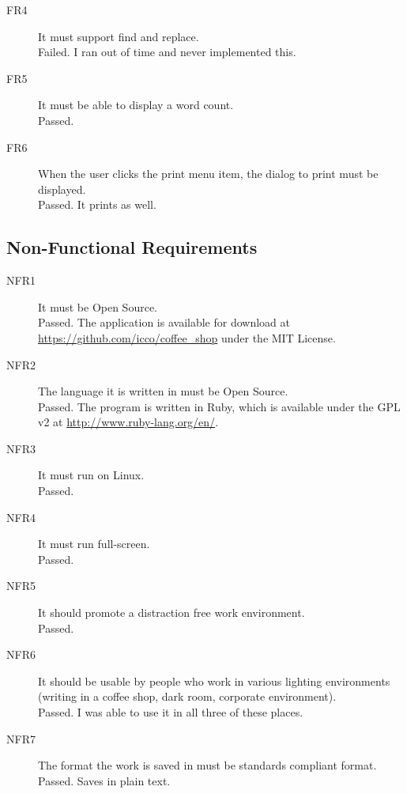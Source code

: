 \documentclass[10pt]{article}
\begin{document}
\begin{description}
\begin{description}
   \end{description}

   \item[FR4] It must support find and replace. \\ Failed. I ran out of time and never implemented this.

   \item[FR5] It must be able to display a word count. \\ Passed.

   \item[FR6] When the user clicks the print menu item, the dialog to print must be displayed. \\ Passed. It prints as well.

\end{description}

\subsection{Non-Functional Requirements}

\begin{description}

   \item[NFR1] It must be Open Source. \\ Passed. The application is available for download at \url{https://github.com/icco/coffee_shop} under the MIT License.

   \item[NFR2] The language it is written in must be Open Source. \\ Passed. The program is written in Ruby, which is available under the GPL v2 at \url{http://www.ruby-lang.org/en/}.

   \item[NFR3] It must run on Linux. \\ Passed.

   \item[NFR4] It must run full-screen. \\ Passed.

   \item[NFR5] It should promote a distraction free work environment. \\ Passed.

   \item[NFR6] It should be usable by people who work in various lighting environments (writing in a coffee shop, dark room, corporate environment). \\ Passed. I was able to use it in all three of these places.

   \item[NFR7] The format the work is saved in must be standards compliant format. \\ Passed. Saves in plain text.

\end{description}
\end{document}
